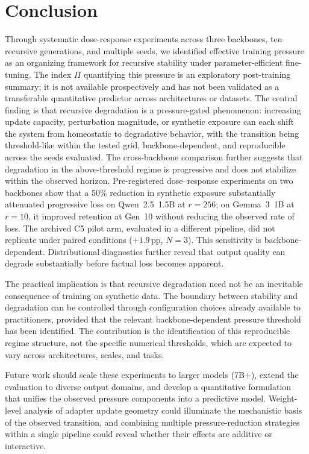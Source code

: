 \documentclass[a4paper,fleqn]{cas-dc}
\newif\ifshowchanges
\newcommand{\rev}[1]{\ifshowchanges{\color{blue}#1}\else{#1}\fi}
\begin{document}
\section{Conclusion}\label{sec:conclusion}

Through systematic dose-response experiments across three backbones, ten
recursive generations, and multiple seeds, we identified effective training
pressure as an organizing framework for recursive stability under
parameter-efficient fine-tuning. \rev{The index $\Pi$ quantifying this pressure is an
exploratory post-training summary; it is not available prospectively and has
not been validated as a transferable quantitative predictor across
architectures or datasets.} The central finding is that recursive
degradation is a pressure-gated phenomenon: increasing update capacity,
perturbation magnitude, or synthetic exposure \rev{can each shift} the system from homeostatic to degradative behavior, with the transition being
\rev{threshold-like within the tested grid}, backbone-dependent, and reproducible across the seeds evaluated. \rev{The cross-backbone comparison further suggests} that degradation in the above-threshold regime is progressive and does not
stabilize within the observed horizon. \rev{Pre-registered dose--response
experiments on two backbones show that a 50\% reduction in synthetic exposure
\rev{substantially} attenuated progressive loss on \rev{Qwen~2.5~1.5B at $r=256$}; on \rev{Gemma~3~1B at $r=10$}, it improved
retention at Gen~10 without reducing the observed rate of loss. The archived C5 pilot arm, evaluated in a
different pipeline, did not replicate under paired conditions ($+1.9$\,pp,
$N=3$).} This sensitivity is backbone-dependent. Distributional diagnostics further reveal
that output quality can degrade substantially before factual loss becomes
apparent.

The practical implication is that recursive degradation need not be an
inevitable consequence of training on synthetic data. The boundary between
stability and degradation can be controlled through configuration choices
already available to practitioners, provided that the relevant
backbone-dependent pressure threshold has been identified. The contribution is
the identification of this reproducible regime structure, not the specific
numerical thresholds, which are expected to vary across architectures, scales,
and tasks.

Future work should scale these experiments to larger models (7B+), extend the
evaluation to diverse output domains, and develop a quantitative formulation
that unifies the observed pressure components into a predictive model.
Weight-level analysis of adapter update geometry could illuminate the
mechanistic basis of the observed transition, and combining multiple
pressure-reduction strategies within a single pipeline could reveal whether
their effects are additive or interactive.
\end{document}
